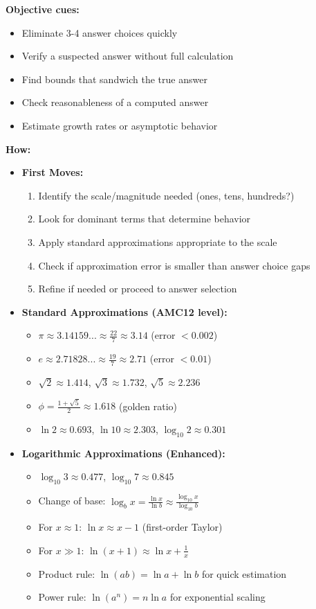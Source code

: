 \documentclass[12pt]{article}
\begin{document}
\textbf{Objective cues:}
\begin{itemize}
    \item Eliminate 3-4 answer choices quickly
    \item Verify a suspected answer without full calculation
    \item Find bounds that sandwich the true answer
    \item Check reasonableness of a computed answer
    \item Estimate growth rates or asymptotic behavior
\end{itemize}

\textbf{How:}
\begin{itemize}
    \item \textbf{First Moves:} 
    \begin{enumerate}
        \item Identify the scale/magnitude needed (ones, tens, hundreds?)
        \item Look for dominant terms that determine behavior
        \item Apply standard approximations appropriate to the scale
        \item Check if approximation error is smaller than answer choice gaps
        \item Refine if needed or proceed to answer selection
    \end{enumerate}
    
    \item \textbf{Standard Approximations (AMC12 level):}
    \begin{itemize}
        \item $\pi \approx 3.14159... \approx \frac{22}{7} \approx 3.14$ (error $< 0.002$)
        \item $e \approx 2.71828... \approx \frac{19}{7} \approx 2.71$ (error $< 0.01$)
        \item $\sqrt{2} \approx 1.414$, $\sqrt{3} \approx 1.732$, $\sqrt{5} \approx 2.236$
        \item $\phi = \frac{1+\sqrt{5}}{2} \approx 1.618$ (golden ratio)
        \item $\ln 2 \approx 0.693$, $\ln 10 \approx 2.303$, $\log_{10} 2 \approx 0.301$
    \end{itemize}
    
    \item \textbf{Logarithmic Approximations (Enhanced):}
    \begin{itemize}
        \item $\log_{10} 3 \approx 0.477$, $\log_{10} 7 \approx 0.845$
        \item Change of base: $\log_b x = \frac{\ln x}{\ln b} \approx \frac{\log_{10} x}{\log_{10} b}$
        \item For $x \approx 1$: $\ln x \approx x - 1$ (first-order Taylor)
        \item For $x \gg 1$: $\ln(x+1) \approx \ln x + \frac{1}{x}$
        \item Product rule: $\ln(ab) = \ln a + \ln b$ for quick estimation
        \item Power rule: $\ln(a^n) = n\ln a$ for exponential scaling
    \end{itemize}
    

\end{itemize}
\end{document}
